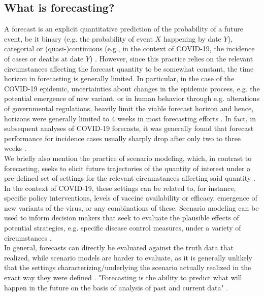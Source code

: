 \subsection{What is forecasting?}
A forecast is an explicit quantitative prediction of the probability of a future event, be it binary (e.g. the probability of event $X$ happening by date $Y$), categorial or (quasi-)continuous (e.g., in the context of COVID-19, the incidence of cases or deaths at date $Y$) \cite{reich_collaborative_2022}. However, since this practice relies on the relevant circumstances affecting the forecast quantity to be somewhat constant, the time horizon in forecasting is generally limited. In particular, in the case of the COVID-19 epidemic, uncertainties about changes in the epidemic process, e.g. the potential emergence of new variant, or in human behavior through e.g. alterations of governmental regulations, heavily limit the viable forecast horizon and hence, horizons were generally limited to 4 weeks in most forecasting efforts \cite{reich_collaborative_2022}. In fact, in subsequent analyses of COVID-19 forecasts, it was generally found that forecast performance for incidence cases usually sharply drop after only two to three weeks .\\
We briefly also mention the practice of scenario modeling, which, in contrast to forecasting, seeks to elicit future trajectories of the quantity of interest under a pre-defined set of settings for the relevant circumstances affecting said quantity \cite{reich_collaborative_2022}. In the context of COVID-19, these settings can be related to, for instance, specific policy interventions, levels of vaccine availability or efficacy, emergence of new variants of the virus, or any combinations of these. Scenario modeling can be used to inform decision makers that seek to evaluate the plausible effects of potential strategies, e.g. specific disease control measures, under a variety of circumstances \cite{reich_collaborative_2022}.\\ 
In general, forecasts can directly be evaluated against the truth data that realized, while scenario models are harder to evaluate, as it is generally unlikely that the settings characterizing/underlying the scenario actually realized in the exact way they were defined \cite{reich_collaborative_2022}.
"Forecasting is the ability to predict what will happen in the future on the basis of analysis of past and current data" \cite{moran_epidemic_2016}.

